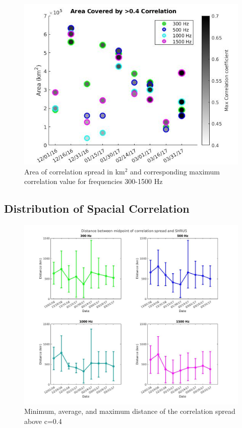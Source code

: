 \begin{figure}[h]
\centering
\includegraphics[scale=0.5]{Figures/area_cov_time_corrr.jpg}
\caption{Area of correlation spread in km$^{2}$ and corresponding maximum correlation value for frequencies 300-1500 Hz}
\label{fig_maxcorr_dist}
\end{figure}

\subsection{Distribution of Spacial Correlation}

\begin{figure}[h]
\centering
\includegraphics[scale=0.38]{Figures/errorbars_tiled.jpg}
\caption{Minimum, average, and maximum distance of the correlation spread above c=0.4}
\label{fig_totalice}
\end{figure}


